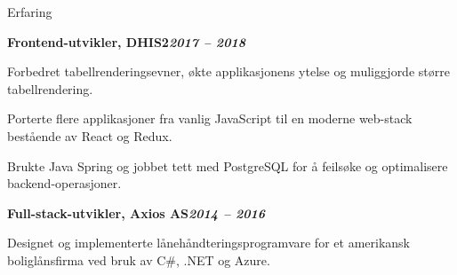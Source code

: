 \begin{rubric}{Erfaring}
\begin{compactitem}
    \vspace{-12pt}
\end{compactitem}
%
\entry*[]%
\textbf{Frontend-utvikler, DHIS2\hfill\textit{2017 -- 2018}} \par
\begin{compactitem}
    \item Forbedret tabellrenderingsevner, økte applikasjonens ytelse og muliggjorde større tabellrendering.
    \item Porterte flere applikasjoner fra vanlig JavaScript til en moderne web-stack bestående av React og Redux.
    \item Brukte Java Spring og jobbet tett med PostgreSQL for å feilsøke og optimalisere backend-operasjoner.
    \vspace{-12pt}
\end{compactitem}
%
\entry*[]%
\textbf{Full-stack-utvikler, Axios AS\hfill\textit{2014 -- 2016}} \par
\begin{compactitem}
    \item Designet og implementerte lånehåndteringsprogramvare for et amerikansk boliglånsfirma ved bruk av C\#, .NET og Azure.
    \vspace{-12pt}
\end{compactitem}
%
\end{rubric}
